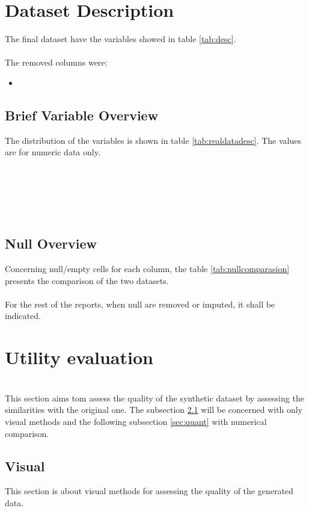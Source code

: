 \documentclass{article}
\begin{document}
\section{Dataset Description}

The final dataset have the variables showed in table \ref{tab:desc}.\\
\\

The removed columns were:\\
\begin{itemize}
  \item {}
  \end{itemize}


\subsection{Brief Variable Overview}
The distribution of the variables is shown in table \ref{tab:realdatadesc}. The values are for numeric data only.\\
\\
\\
\\
\\
\\
\subsection{Null Overview}

Concerning null/empty cells for each column, the table \ref{tab:nullcomparasion} presents the comparison of the two datasets.\\

\\

For the rest of the reports, when null are removed or imputed, it shall be indicated.
\section{Utility evaluation}\\
This section aims tom assess the quality of the synthetic dataset by assessing the similarities with the original one. The subsection \ref{sec:visual} will be concerned with only visual methods and the following subsection \ref{sec:quant} with numerical comparison.\\
\subsection{Visual}  \label{sec:visual}
This section is about visual methods for assessing the quality of the generated data.\\
\end{document}
